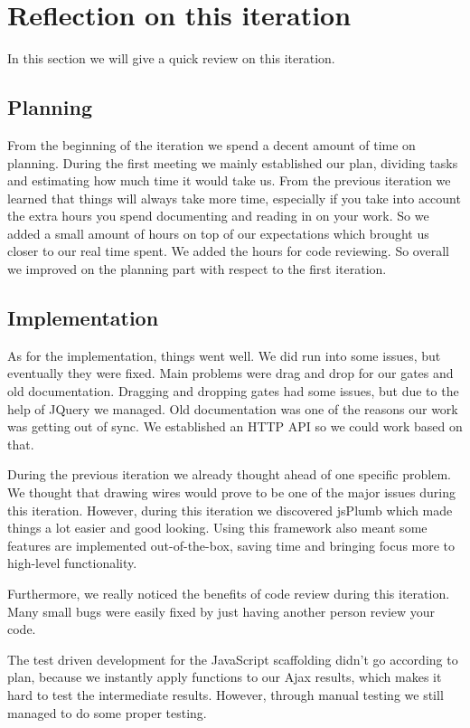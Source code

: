 \documentclass[a4paper]{article}
\begin{document}
\section{Reflection on this iteration}
In this section we will give a quick review on this iteration. \\

\subsection{Planning}
From the beginning of the iteration we spend a decent amount of time on planning. During the first meeting we mainly established our plan, dividing tasks and estimating how much time it would take us. From the previous iteration we learned that things will always take more time, especially if you take into account the extra hours you spend documenting and reading in on your work. So we added a small amount of hours on top of our expectations which brought us closer to our real time spent. We added the hours for code reviewing. So overall we improved on the planning part with respect to the first iteration. 

\subsection{Implementation}
As for the implementation, things went well. We did run into some issues, but eventually they were fixed. Main problems were drag and drop for our gates and old documentation. 
Dragging and dropping gates had some issues, but due to the help of JQuery we managed.
Old documentation was one of the reasons our work was getting out of sync. We established an HTTP API so we could work based on that. 

During the previous iteration we already thought ahead of one specific problem. We thought that drawing wires would prove to be one of the major issues during this iteration. However, during this iteration we discovered jsPlumb which made things a lot easier and good looking. Using this framework also meant some features are implemented out-of-the-box, saving time and bringing focus  more to high-level functionality.

Furthermore, we really noticed the benefits of code review during this iteration. Many small bugs were easily fixed by just having another person review your code.

The test driven development for the JavaScript scaffolding didn't go according to plan, because we instantly apply functions to our Ajax results, which makes it hard to test the intermediate results. However, through manual testing we still managed to do some proper testing.
\end{document}
